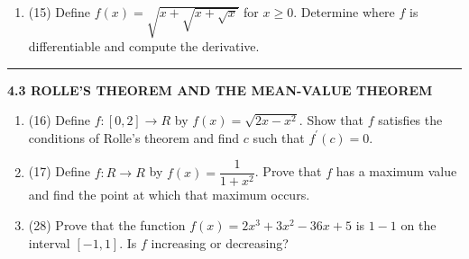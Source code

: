 \documentclass[fleqn]{article}
\begin{document}
\begin{enumerate}
      \textcolor{hwColor}{
        On page $119$ of the textbook, we learned that \emph{If $f$ is differentiable at $x_0$ and $g$ is differentiable at $f(x_0)$, then $gof$ is differentiable at $x_0$}.
        (Chain rule)
        $$
          \left(gof\right)^'(x_0)=g^'\left(f(x_0)\right) f^'(x_0)
        $$
        The composition of two differentiable functions is also differentiable. We know $x^3$ is differentiable and by the chain rule $f(x^3)$ is differentiable too.
        \\
        \\
        $
          \left(f(x^3)\right)^'
          =\dfrac{d}{dx}x^3 \times f^'(x^3)
          =3x^2 f^'(x^3)
        $
        \\
        \\
        Now we are ready to find $g^'(x)$.
        \\
        \\
        $
          g^'(x)=\dfrac{d}{dx}(x^2) f(x^3)+x^2\dfrac{d}{dx} \left(f(x^3)\right)^
          =2x f(x^3)+x^2 \left[3x^2 f^'(x^3)\right]
          \\
          \\
          \\
          \therefore ~~~~ g^'(x)=2x f(x^3)+3x^4 f^'(x^3) ~~~~ \checkmark
          \\
        $
      }
    
    \item (15) Define $f(x)=\sqrt{x+\sqrt{x+\sqrt{x}}}$ for $x \geq 0$. Determine where $f$ is differentiable and compute
    the derivative. 



  \end{enumerate}

  \rule{15cm}{1pt}

  \textbf{4.3 ROLLE'S THEOREM AND THE MEAN-VALUE THEOREM}
  \begin{enumerate}
    \item (16) Define $f: [0, 2] \longrightarrow R$ by $f(x)=\sqrt{2x-x^2}$. Show that $f$ satisfies the conditions of Rolle's
    theorem and find $c$ such that $f^'(c)=0$.



    \item (17) Define $f: R \longrightarrow R$ by $f(x)=\dfrac{1}{1+x^2}$. Prove that $f$ has a maximum value and find the
    point at which that maximum occurs.



    \item (28) Prove that the function $f(x)=2x^3+3x^2-36x+5$ is $1-1$ on the interval $[-1,1]$. Is $f$ increasing or decreasing?



  \end{enumerate}
\end{document}
